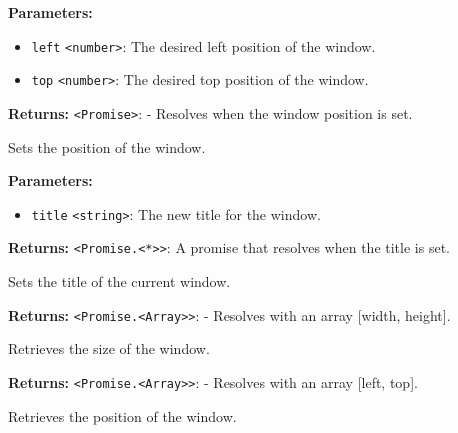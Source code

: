 \documentclass[12pt,a4paper]{article}
\begin{document}
\noindent \textbf{Parameters:}
\begin{itemize}
  \item \texttt{left} \texttt{<number>}: The desired left position of the window.
  \item \texttt{top} \texttt{<number>}: The desired top position of the window.
\end{itemize}

\noindent \textbf{Returns:} \texttt{<Promise>}: - Resolves when the window position is set.

\noindent Sets the position of the window.

\vspace{5mm}
\noindent {}


\noindent \textbf{Parameters:}
\begin{itemize}
  \item \texttt{title} \texttt{<string>}: The new title for the window.
\end{itemize}

\noindent \textbf{Returns:} \texttt{<Promise.<*>>}: A promise that resolves when the title is set.

\noindent Sets the title of the current window.

\vspace{5mm}
\noindent {}


\noindent \textbf{Returns:} \texttt{<Promise.<Array>>}: - Resolves with an array [width, height].

\noindent Retrieves the size of the window.

\vspace{5mm}
\noindent {}


\noindent \textbf{Returns:} \texttt{<Promise.<Array>>}: - Resolves with an array [left, top].

\noindent Retrieves the position of the window.

\vspace{5mm}
\noindent {}
\end{document}
